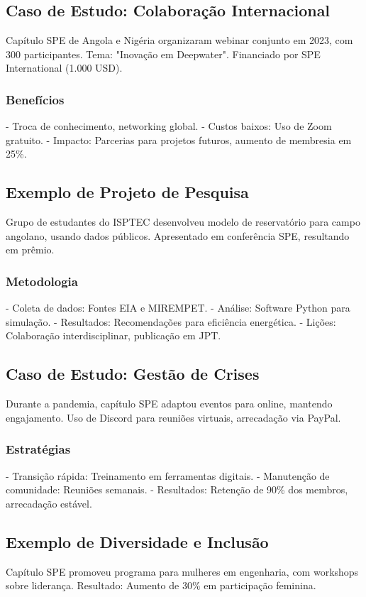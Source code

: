 \documentclass[12pt]{article}
\begin{document}
\subsection{Caso de Estudo: Colaboração Internacional}
Capítulo SPE de Angola e Nigéria organizaram webinar conjunto em 2023, com 300 participantes. Tema: "Inovação em Deepwater". Financiado por SPE International (1.000 USD).

\subsubsection{Benefícios}
- Troca de conhecimento, networking global.
- Custos baixos: Uso de Zoom gratuito.
- Impacto: Parcerias para projetos futuros, aumento de membresia em 25\%.

\subsection{Exemplo de Projeto de Pesquisa}
Grupo de estudantes do ISPTEC desenvolveu modelo de reservatório para campo angolano, usando dados públicos. Apresentado em conferência SPE, resultando em prêmio.

\subsubsection{Metodologia}
- Coleta de dados: Fontes EIA e MIREMPET.
- Análise: Software Python para simulação.
- Resultados: Recomendações para eficiência energética.
- Lições: Colaboração interdisciplinar, publicação em JPT.

\subsection{Caso de Estudo: Gestão de Crises}
Durante a pandemia, capítulo SPE adaptou eventos para online, mantendo engajamento. Uso de Discord para reuniões virtuais, arrecadação via PayPal.

\subsubsection{Estratégias}
- Transição rápida: Treinamento em ferramentas digitais.
- Manutenção de comunidade: Reuniões semanais.
- Resultados: Retenção de 90\% dos membros, arrecadação estável.

\subsection{Exemplo de Diversidade e Inclusão}
Capítulo SPE promoveu programa para mulheres em engenharia, com workshops sobre liderança. Resultado: Aumento de 30\% em participação feminina.
\end{document}
